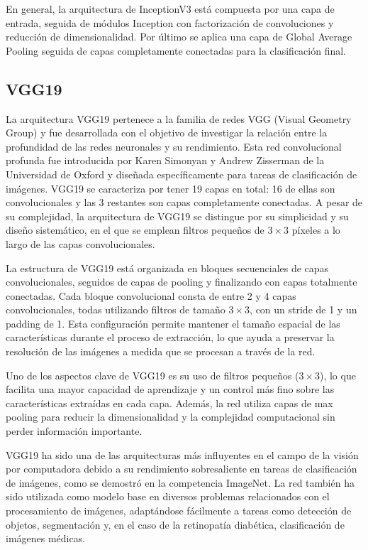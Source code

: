 En general, la arquitectura de InceptionV3 está compuesta por una capa de entrada, seguida de módulos Inception con factorización de convoluciones y reducción de dimensionalidad. Por último se aplica una capa de Global Average Pooling seguida de capas completamente conectadas para la clasificación final.

\subsection{VGG19}

La arquitectura VGG19 pertenece a la familia de redes VGG (Visual Geometry Group) y fue desarrollada con el objetivo de investigar la relación entre la profundidad de las redes neuronales y su rendimiento. Esta red convolucional profunda fue introducida por Karen Simonyan y Andrew Zisserman de la Universidad de Oxford y diseñada específicamente para tareas de clasificación de imágenes. VGG19 se caracteriza por tener 19 capas en total: 16 de ellas son convolucionales y las 3 restantes son capas completamente conectadas. A pesar de su complejidad, la arquitectura de VGG19 se distingue por su simplicidad y su diseño sistemático, en el que se emplean filtros pequeños de $3 \times 3$ píxeles a lo largo de las capas convolucionales.

La estructura de VGG19 está organizada en bloques secuenciales de capas convolucionales, seguidos de capas de pooling y finalizando con capas totalmente conectadas. Cada bloque convolucional consta de entre 2 y 4 capas convolucionales, todas utilizando filtros de tamaño $3 \times 3$, con un stride de 1 y un padding de 1. Esta configuración permite mantener el tamaño espacial de las características durante el proceso de extracción, lo que ayuda a preservar la resolución de las imágenes a medida que se procesan a través de la red.

Uno de los aspectos clave de VGG19 es su uso de filtros pequeños ($3 \times 3$), lo que facilita una mayor capacidad de aprendizaje y un control más fino sobre las características extraídas en cada capa. Además, la red utiliza capas de max pooling para reducir la dimensionalidad y la complejidad computacional sin perder información importante.

VGG19 ha sido una de las arquitecturas más influyentes en el campo de la visión por computadora debido a su rendimiento sobresaliente en tareas de clasificación de imágenes, como se demostró en la competencia ImageNet. La red también ha sido utilizada como modelo base en diversos problemas relacionados con el procesamiento de imágenes, adaptándose fácilmente a tareas como detección de objetos, segmentación y, en el caso de la retinopatía diabética, clasificación de imágenes médicas.

